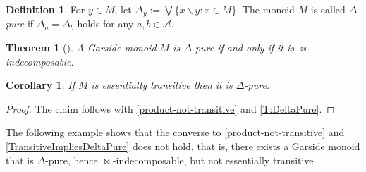 \documentclass[a4paper,final]{article}
\let\zs=\bowtie
\theoremstyle{plain}
\newtheorem{theorem}{Theorem}
\newtheorem{corollary}[corollary]{Corollary}
\theoremstyle{remark}
\theoremstyle{definition}
\newtheorem{definition}[definition]{Definition}
\begin{document}
\begin{definition}\label{D:DeltaPure}
  For $y\in M$, let $\Delta_y := {\bigvee}\{ x{\backslash} y : x \in M \}$.
  The monoid $M$ is called \emph{$\Delta$-pure} if $\Delta_a=\Delta_b$ holds for any $a,b\in{\mathcal{A}}$.
\end{definition}

\begin{theorem}[{\cite[Proposition~4.7]{Picantin01}\cite[Theorem~36]{Zappa-Szep}}]\label{T:DeltaPure}
  A Garside monoid $M$ is $\Delta$-pure if and only if it is $\zs$-indecom\-posable.
\end{theorem}

\begin{corollary}\label{TransitiveImpliesDeltaPure}
  If $M$ is essentially transitive then it is $\Delta$-pure.
\end{corollary}
\begin{proof}
  The claim follows with \autoref{product-not-transitive} and \autoref{T:DeltaPure}.
\end{proof}

The following example shows that the converse to \autoref{product-not-transitive} and \autoref{TransitiveImpliesDeltaPure} does not hold, that is, there exists a Garside monoid that is $\Delta$-pure, hence $\zs$-indecomposable, but not essentially transitive.
\end{document}
